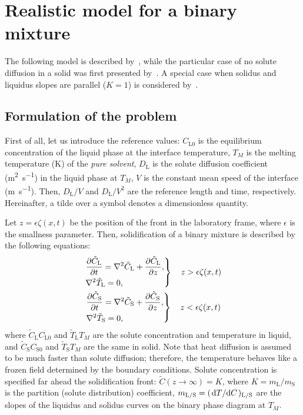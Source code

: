 \documentclass{article}
\newcommand{\liq}{\text{L}}
\newcommand{\sol}{\text{S}}
\begin{document}
\section{Realistic model for a binary mixture}

The following model is described by~\textcite{caroli1982emergence},
while the particular case of no solute diffusion in a solid was first presented by~\textcite{wollkind1970nonlinear}.
A special case when solidus and liquidus slopes are parallel ($K=1$) is considered by~\textcite{langer1977studies}.

\subsection{Formulation of the problem}

First of all, let us introduce the reference values:
$C_{\liq0}$ is the equilibrium concentration of the liquid phase at the interface temperature,
$T_M$ is the melting temperature (\si{\K}) of the \emph{pure solvent},
$D_\liq$ is the solute diffusion coefficient (\si{\m\squared\per\s}) in the liquid phase at $T_M$,
$V$ is the constant mean speed of the interface (\si{\m\per\s}).
Then, $D_\liq/V$ and $D_\liq/V^2$ are the reference length and time, respectively.
Hereinafter, a tilde over a symbol denotes a dimensionless quantity.

Let $z = \epsilon\zeta(x,t)$ be the position of the front in the laboratory frame,
where $\epsilon$ is the smallness parameter.
Then, solidification of a binary mixture is described by the following equations:
\begin{gather}
    \left.\begin{aligned}
        &\pdv{\tilde{C}_\liq}{t} = \nabla^2 \tilde{C}_\liq + \pdv{\tilde{C}_\liq}{z}, \\
        &\nabla^2 \tilde{T}_\liq = 0,
    \end{aligned}\right\} \quad z > \epsilon\zeta(x,t) \label{eq:governingL}\\
    \left.\begin{aligned}
        &\pdv{\tilde{C}_\sol}{t} = \nabla^2 \tilde{C}_\sol + \pdv{\tilde{C}_\sol}{z}, \\
        &\nabla^2 \tilde{T}_\sol = 0,
    \end{aligned}\right\} \quad z < \epsilon\zeta(x,t) \label{eq:governingS}
\end{gather}
where $\tilde{C}_\liq C_{\liq0}$ and $\tilde{T}_\liq T_M$ are the solute concentration and temperature in liquid,
and $\tilde{C}_\sol C_{\sol0}$ and $\tilde{T}_\sol T_M$ are the same in solid.
Note that heat diffusion is assumed to be much faster than solute diffusion;
therefore, the temperature behaves like a frozen field determined by the boundary conditions.
Solute concentration is specified far ahead the solidification front: $\tilde{C}(z\to\infty) = K$,
where $K = m_\liq/m_\sol$ is the partition (solute distribution) coefficient,
$m_{\liq/\sol} = (\dv*{T}{C})_{\liq/\sol}$ are the slopes of the liquidus and solidus curves
on the binary phase diagram at $T_M$.
\end{document}
